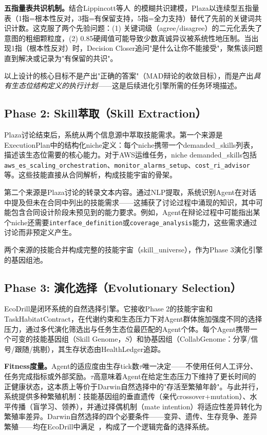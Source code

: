 \documentclass[conference]{IEEEtran}
\begin{document}
\textbf{五指量表共识机制。}结合Lippincott等人~\cite{lippincott2025fuzzy}的模糊共识建模，Plaza以连续型五指量表（1指=根本性反对，3指=有保留支持，5指=全力支持）替代了先前的关键词共识计数。这克服了两个先验问题：(1) 关键词级（agree/disagree）的二元化丢失了意图的粗细颗粒度，(2) 0.85硬阈值可能导致少数真诚异议被系统性地压制。当出现1指（根本性反对）时，Decision Closer追问"是什么让你不能接受"，聚焦该问题直到解决或记录为"有保留的共识"。

以上设计的核心目标不是产出"正确的答案"（MAD辩论的收敛目标），而是产出\emph{具有生态位结构定义的执行计划}——这是后续进化引擎所需的任务环境描述。

\subsection{Phase 2: Skill萃取（Skill Extraction）}

Plaza讨论结束后，系统从两个信息源中萃取技能需求。第一个来源是ExecutionPlan中的结构化niche定义：每个niche携带一个demanded\_skills列表，描述该生态位需要的核心能力。对于AWS运维任务，niche demanded\_skills包括{\texttt{aws\_es\_scaling\_orchestration}}、{\texttt{monitor\_alarms\_setup}}、{\texttt{cost\_ri\_advisor}}等。这些技能直接从合同解析，构成技能宇宙的骨架。

第二个来源是Plaza讨论的转录文本内容。通过NLP提取，系统识别Agent在对话中提及但未在合同中列出的技能需求——这捕获了讨论过程中涌现的知识，其中可能包含合同设计阶段未预见到的能力要求。例如，Agent在辩论过程中可能指出某个niche还需要{\texttt{interface\_definition}}或{\texttt{coverage\_analysis}}能力，这些需求通过讨论而非预定义产生。

两个来源的技能合并构成完整的技能宇宙（skill\_universe），作为Phase 3演化引擎的基因组池。

\subsection{Phase 3: 演化选择（Evolutionary Selection）}

EcoDrill是闭环系统的自然选择引擎。它接收Phase 2的技能宇宙和TaskHabitatContract，在代谢约束和生态压力下对Agent群体施加强度不同的选择压力，通过多代演化筛选出与任务生态位最匹配的Agent个体。每个Agent携带一个可变的技能基因组（Skill Genome，$S$）和协基因组（CollabGenome：分享/信号/跟随/挑剔），其生存状态由HealthLedger追踪。

\textbf{Fitness度量。}Agent的适应度由生存tick数$\tau$唯一决定——不使用任何人工评分、任务完成指标或外部奖励。$\tau$高意味着Agent在给定生态压力下维持了更长时间的正健康状态，这本质上等价于Darwin自然选择中的"存活至繁殖年龄"。与此并行，系统提供多种繁殖机制：技能基因组的垂直遗传（亲代crossover+mutation）、水平传播（盲学习、领养），并通过择偶机制（mate intention）将适应性差异转化为繁殖率差异。Darwin自然选择的四个必要条件——变异、遗传、生存竞争、差异繁殖——均在EcoDrill中满足~\cite{darwin1859,visscher2008heritability,gause1934struggle}，构成了一个逻辑完备的选择系统。
\end{document}
